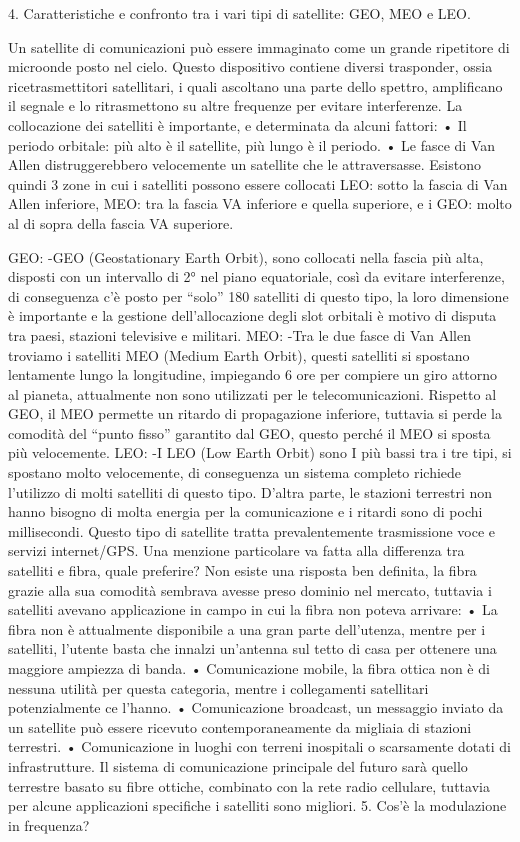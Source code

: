 4.	Caratteristiche e confronto tra i vari tipi di satellite: GEO, MEO e LEO.

Un satellite di comunicazioni può essere immaginato come un grande ripetitore di microonde posto nel cielo. Questo dispositivo contiene diversi trasponder, ossia ricetrasmettitori satellitari, i quali ascoltano una parte dello spettro, amplificano il segnale e lo ritrasmettono su altre frequenze per evitare interferenze.
La collocazione dei satelliti è importante, e determinata da alcuni fattori:
•	Il periodo orbitale: più alto è il satellite, più lungo è il periodo.
•	Le fasce di Van Allen distruggerebbero velocemente un satellite che le attraversasse.
Esistono quindi 3 zone in cui i satelliti possono essere collocati LEO: sotto la fascia di Van Allen inferiore, MEO: tra la fascia VA inferiore e quella superiore, e i GEO: molto al di sopra della fascia VA superiore.
 
GEO:
-GEO (Geostationary Earth Orbit), sono collocati nella fascia più alta, disposti con un intervallo di 2° nel piano equatoriale, così da evitare interferenze, di conseguenza c’è posto per “solo” 180 satelliti di questo tipo, la loro dimensione è importante e la gestione dell’allocazione degli slot orbitali è motivo di disputa tra paesi, stazioni televisive e militari.
MEO:
-Tra le due fasce di Van Allen troviamo i satelliti MEO (Medium Earth Orbit), questi satelliti si spostano lentamente lungo la longitudine, impiegando 6 ore per compiere un giro attorno al pianeta, attualmente non sono utilizzati per le telecomunicazioni. Rispetto al GEO, il MEO permette un ritardo di propagazione inferiore, tuttavia si perde la comodità del “punto fisso” garantito dal GEO, questo perché il MEO si sposta più velocemente.
LEO:
-I LEO (Low Earth Orbit) sono I più bassi tra i tre tipi, si spostano molto velocemente, di conseguenza un sistema completo richiede l’utilizzo di molti satelliti di questo tipo. D’altra parte, le stazioni terrestri non hanno bisogno di molta energia per la comunicazione e i ritardi sono di pochi millisecondi.
Questo tipo di satellite tratta prevalentemente trasmissione voce e servizi internet/GPS.
Una menzione particolare va fatta alla differenza tra satelliti e fibra, quale preferire? 
Non esiste una risposta ben definita, la fibra grazie alla sua comodità sembrava avesse preso dominio nel mercato, tuttavia i satelliti avevano applicazione in campo in cui la fibra non poteva arrivare:
•	La fibra non è attualmente disponibile a una gran parte dell’utenza, mentre per i satelliti, l’utente basta che innalzi un’antenna sul tetto di casa per ottenere una maggiore ampiezza di banda.
•	Comunicazione mobile, la fibra ottica non è di nessuna utilità per questa categoria, mentre i collegamenti satellitari potenzialmente ce l’hanno.
•	Comunicazione broadcast, un messaggio inviato da un satellite può essere ricevuto contemporaneamente da migliaia di stazioni terrestri.
•	Comunicazione in luoghi con terreni inospitali o scarsamente dotati di infrastrutture.
Il sistema di comunicazione principale del futuro sarà quello terrestre basato su fibre ottiche, combinato con la rete radio cellulare, tuttavia per alcune applicazioni specifiche i satelliti sono migliori.
5.	Cos’è la modulazione in frequenza?

